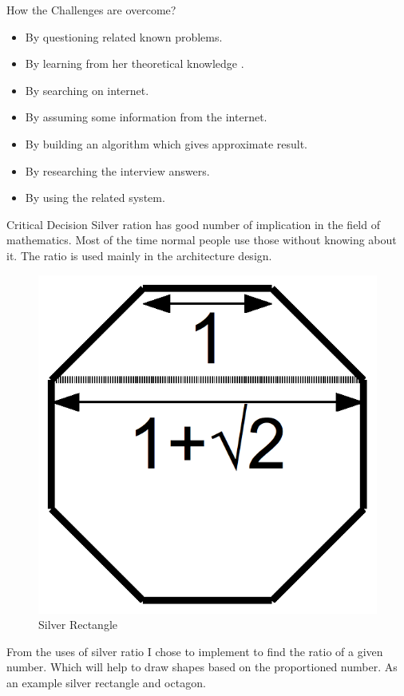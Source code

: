 \documentclass[final]{beamer}
\newlength{\onecolwid}
\newlength{\twocolwid}
\begin{document}
\begin{frame}[t]
\begin{columns}[t]
\begin{column}{\twocolwid}
\begin{columns}[t,totalwidth=\twocolwid]
\begin{column}{\onecolwid}
\begin{block}{How the Challenges are overcome?}
 \begin{itemize}
\item By questioning related known problems.
\item By learning from her theoretical knowledge .
\item By searching on internet.
\item By assuming some information from the internet. 
\item By building an algorithm which gives approximate result.
\item By researching the interview answers.
\item By using the related system.
\end{itemize}
\end{block}

\begin{block}{Critical Decision}
Silver ration has good number of implication in the field of mathematics. Most of the time normal people use those without knowing about it. The ratio is used mainly in the architecture design. 
\begin{figure}
\includegraphics[width=0.3\linewidth]{silver_ratio_octagon.png}
\caption{Silver Rectangle}
\end{figure}
From the uses of silver ratio I chose to implement to find the ratio of a given number. Which will help to draw shapes based on the proportioned number. As an example silver rectangle and octagon. 
\end{block}

\end{column} %

\end{columns} %





\end{column}
\end{columns}
\end{frame}
\end{document}
